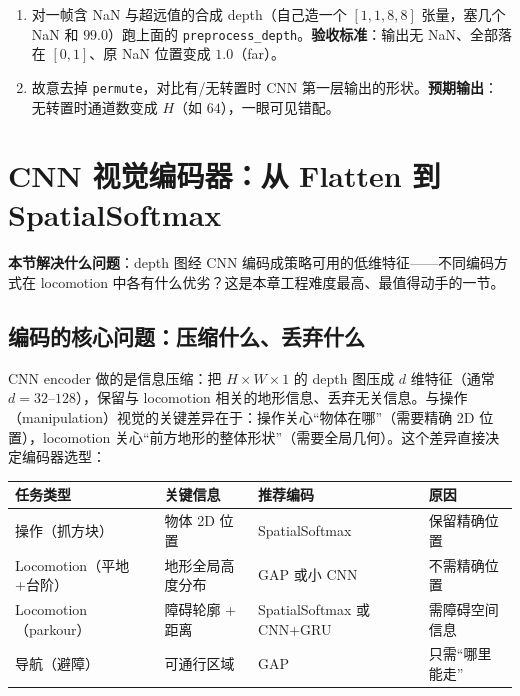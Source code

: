 \begin{practice}[把预处理跑成可对照的数字]
\begin{enumerate}
\item 对一帧含 NaN 与超远值的合成 depth（自己造一个 $[1,1,8,8]$ 张量，塞几个 NaN 和 $99.0$）跑上面的 \verb|preprocess_depth|。\textbf{验收标准}：输出无 NaN、全部落在 $[0,1]$、原 NaN 位置变成 $1.0$（far）。
\item 故意去掉 \verb|permute|，对比有/无转置时 CNN 第一层输出的形状。\textbf{预期输出}：无转置时通道数变成 $H$（如 $64$），一眼可见错配。
\end{enumerate}
\end{practice}

\section{CNN 视觉编码器：从 Flatten 到 SpatialSoftmax}
\label{sec:rlmc-vm-encoder}

\textbf{本节解决什么问题}：depth 图经 CNN 编码成策略可用的低维特征——不同编码方式在 locomotion 中各有什么优劣？这是本章工程难度最高、最值得动手的一节。

\subsection{编码的核心问题：压缩什么、丢弃什么}
\label{sec:rlmc-vm-encode-core}

CNN encoder 做的是信息压缩：把 $H\times W\times 1$ 的 depth 图压成 $d$ 维特征（通常 $d=32$--$128$），保留与 locomotion 相关的地形信息、丢弃无关信息。与操作（manipulation）视觉的关键差异在于：操作关心“物体在哪”（需要精确 2D 位置），locomotion 关心“前方地形的整体形状”（需要全局几何）。这个差异直接决定编码器选型：

\begin{center}
\small
\begin{tabular}{@{}llll@{}}
\toprule
任务类型 & 关键信息 & 推荐编码 & 原因 \\
\midrule
操作（抓方块） & 物体 2D 位置 & SpatialSoftmax & 保留精确位置 \\
Locomotion（平地+台阶） & 地形全局高度分布 & GAP 或小 CNN & 不需精确位置 \\
Locomotion（parkour） & 障碍轮廓 + 距离 & SpatialSoftmax 或 CNN+GRU & 需障碍空间信息 \\
导航（避障） & 可通行区域 & GAP & 只需“哪里能走” \\
\bottomrule
\end{tabular}
\end{center}

